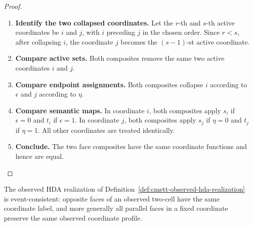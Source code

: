 \begin{proof}
    \leavevmode
    \begin{enumerate}
        \item \textbf{Identify the two collapsed coordinates.}
        Let the \(r\)-th and \(s\)-th active coordinates be \(i\) and \(j\),
        with \(i\) preceding \(j\) in the chosen order. Since \(r<s\), after
        collapsing \(i\), the coordinate \(j\) becomes the \((s-1)\)-st
        active coordinate.

        \item \textbf{Compare active sets.}
        Both composites remove the same two active coordinates \(i\) and
        \(j\).

        \item \textbf{Compare endpoint assignments.}
        Both composites collapse \(i\) according to \(\epsilon\) and \(j\)
        according to \(\eta\).

        \item \textbf{Compare semantic maps.}
        In coordinate \(i\), both composites apply \(s_i\) if
        \(\epsilon=0\) and \(t_i\) if \(\epsilon=1\). In coordinate \(j\),
        both composites apply \(s_j\) if \(\eta=0\) and \(t_j\) if
        \(\eta=1\). All other coordinates are treated identically.

        \item \textbf{Conclude.}
        The two face composites have the same coordinate functions and hence
        are equal.
    \end{enumerate}
\end{proof}

\begin{theorem}
\label{thm:cmett-observed-realization-event-consistent}
    The observed HDA realization of
    Definition~\ref{def:cmett-observed-hda-realization} is event-consistent:
    opposite faces of an observed two-cell have the same coordinate label, and
    more generally all parallel faces in a fixed coordinate preserve the same
    observed coordinate profile.
\end{theorem}

